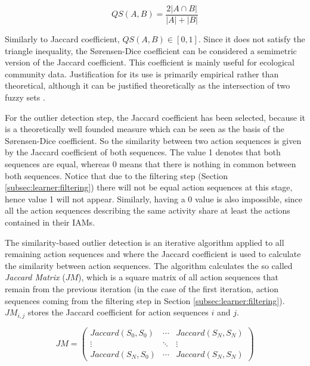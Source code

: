 \begin{equation}
 QS(A, B) = \frac{2 |A \cap B|}{|A| + |B|}
\end{equation}

Similarly to Jaccard coefficient, $QS(A, B) \in [0, 1]$. Since it does not satisfy the triangle inequality, the S{\o}rensen-Dice coefficient can be considered a semimetric version of the Jaccard coefficient. This coefficient is mainly useful for ecological community data. Justification for its use is primarily empirical rather than theoretical, although it can be justified theoretically as the intersection of two fuzzy sets \cite{Roberts1986}. 

For the outlier detection step, the Jaccard coefficient has been selected, because it is a theoretically well founded measure which can be seen as the basis of the S{\o}rensen-Dice coefficient. So the similarity between two action sequences is given by the Jaccard coefficient of both sequences. The value 1 denotes that both sequences are equal, whereas 0 means that there is nothing in common between both sequences. Notice that due to the filtering step (Section \ref{subsec:learner:filtering}) there will not be equal action sequences at this stage, hence value 1 will not appear. Similarly, having a 0 value is also impossible, since all the action sequences describing the same activity share at least the actions contained in their IAMs. 

The similarity-based outlier detection is an iterative algorithm applied to all remaining action sequences and where the Jaccard coefficient is used to calculate the similarity between action sequences. The algorithm calculates the so called \textit{Jaccard Matrix} ($JM$), which is a square matrix of all action sequences that remain from the previous iteration (in the case of the first iteration, action sequences coming from the filtering step in Section \ref{subsec:learner:filtering}). $JM_{i, j}$ stores the Jaccard coefficient for action sequences $i$ and $j$. 

\begin{equation}
JM = \left(
\begin{array}{ccc}
 Jaccard(S_0, S_0) & \cdots & Jaccard(S_N,S_N) \\
 \vdots & \ddots & \vdots \\
 Jaccard(S_N,S_0) & \cdots & Jaccard(S_N,S_N) 
\end{array}
\right)
\end{equation}

